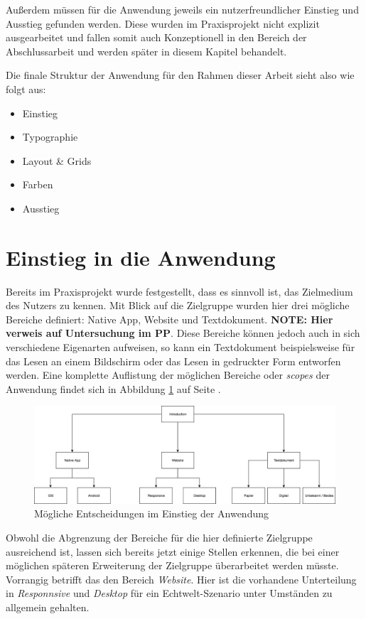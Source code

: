 Außerdem müssen für die Anwendung jeweils ein nutzerfreundlicher Einstieg und Ausstieg gefunden werden. Diese wurden im Praxisprojekt nicht explizit ausgearbeitet und fallen somit auch Konzeptionell in den Bereich der Abschlussarbeit und werden später in diesem Kapitel behandelt.

Die finale Struktur der Anwendung für den Rahmen dieser Arbeit sieht also wie folgt aus:

\begin{itemize}
  \item Einstieg
  \item Typographie
  \item Layout \& Grids
  \item Farben
  \item Ausstieg
\end{itemize}

\section{Einstieg in die Anwendung}
Bereits im Praxisprojekt wurde festgestellt, dass es sinnvoll ist, das Zielmedium des Nutzers zu kennen. Mit Blick auf die Zielgruppe wurden hier drei mögliche Bereiche definiert: Native App, Website und Textdokument. \textbf{NOTE: Hier verweis auf Untersuchung im PP}. Diese Bereiche können jedoch auch in sich verschiedene Eigenarten aufweisen, so kann ein Textdokument beispielsweise für das Lesen an einem Bildschirm oder das Lesen in gedruckter Form entworfen werden. Eine komplette Auflistung der möglichen Bereiche oder \textit{scopes} der Anwendung findet sich in Abbildung \ref{fig:intro} auf Seite \pageref{fig:intro}.

\begin{figure}[h]
    \centering
    \includegraphics[width=1\textwidth]{images/ablauf_intro.png}
    \caption{Mögliche Entscheidungen im Einstieg der Anwendung}
    \label{fig:intro}
\end{figure}

Obwohl die Abgrenzung der Bereiche für die hier definierte Zielgruppe ausreichend ist, lassen sich bereits jetzt einige Stellen erkennen, die bei einer möglichen späteren Erweiterung der Zielgruppe überarbeitet werden müsste. Vorrangig betrifft das den Bereich \textit{Website}. Hier ist die vorhandene Unterteilung in \textit{Responnsive} und \textit{Desktop} für ein Echtwelt-Szenario unter Umständen zu allgemein gehalten.

